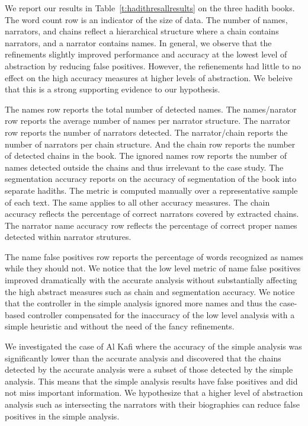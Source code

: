 \documentclass[11pt,letterpaper]{article}
\begin{document}
We report our results in Table~\ref{t:hadithresallresults} on the three hadith books.
The word count row is an indicator of the size of data.
The number of names, narrators, and chains reflect a hierarchical structure where a chain contains
narrators, and a narrator contains names.
In general, we observe that the refinements slightly improved performance and accuracy at
the lowest level of abstraction by reducing false positives.
However, the refienements had little to no effect on the high accuracy measures at higher
levels of abstraction.
We beleive that this is a strong supporting evidence to our hypothesis.

The names row reports the total number of detected names. The names/narator row reports the average
number of names per narrator structure. The narrator row reports the number of narrators detected.
The narrator/chain reports the number of narrators per chain structure. And the chain row reports
the number of detected chains in the book.
The ignored names row reports the number of names detected outside the chains and thus irrelevant to
the case study.
The segmentation accuracy reports on the accuracy of segmentation of the book into separate hadiths.
The metric is computed manually over a representative sample of each text. The same applies to all other accuracy measures.
The chain accuracy reflects the percentage of correct narrators covered by extracted chains.
The narrator name accuracy row reflects the percentage of correct proper names detected within
narrator strutures.

The name false positives row reports the percentage of words recognized as names while they should not.
We notice that the low level metric of name false positives improved dramatically with the accurate
analysis without substantially affecting the high abstract measures such as chain and segmentation
accuracy.
We notice that the controller in the simple analysis ignored more names and thus the case-based
controller compensated for the inaccuracy of the low level analysis with a simple heuristic and
without the need of the fancy refinements.

We investigated the case of Al Kafi where the accuracy of the simple analysis was significantly lower than the accurate
analysis and discovered that the chains detected by the accurate analysis were a subset of those detected by the simple
analysis. 
This means that the simple analysis results have false positives and did not miss important information. We hypothesize
that a higher level of abstraction analysis such as intersecting the narrators with their biographies can 
reduce false positives in the simple analysis.
\end{document}
